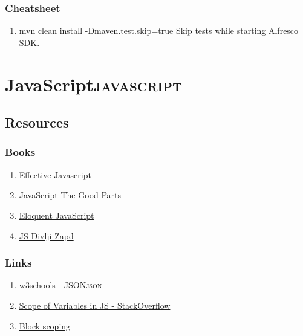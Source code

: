 \documentclass[11pt]{article}
\begin{document}
\subsubsection{Cheatsheet}
\label{sec:org83c35f7}
\begin{enumerate}
\item mvn clean install -Dmaven.test.skip=true
\label{sec:orgd45b603}
Skip tests while starting Alfresco SDK.
\end{enumerate}
\section{JavaScript\hfill{}\textsc{javascript}}
\label{sec:org888be57}
\subsection{Resources}
\label{sec:org2c58d03}
\subsubsection{Books}
\label{sec:orgb77e202}
\begin{enumerate}
\item \href{../notes/pdf/EffectiveJavaScript.pdf::1}{Effective Javascript}
\label{sec:orge2e2073}
\item \href{../notes/pdf/JavaScriptTheGoodParts.pdf::1}{JavaScript The Good Parts}
\label{sec:org441f57a}
\item \href{../notes/pdf/EloquentJavaScript.pdf::1}{Eloquent JavaScript}
\label{sec:org7537d93}
\item \href{../notes/pdf/JSDivljiZapad.pdf::1}{JS Divlji Zapd}
\label{sec:org4f33ecd}
\end{enumerate}
\subsubsection{Links}
\label{sec:org51026a8}
\begin{enumerate}
\item \href{https://www.w3schools.com/js/js\_json\_intro.asp}{w3schools - JSON}\hfill{}\textsc{json}
\label{sec:org644baf1}
\item \href{https://stackoverflow.com/questions/500431/what-is-the-scope-of-variables-in-javascript}{Scope of Variables in JS - StackOverflow}
\label{sec:orgf5908f9}
\item \href{https://developer.mozilla.org/en-US/docs/Web/JavaScript/Reference/Statements/block}{Block scoping}
\label{sec:orgf215a5b}
\end{enumerate}
\end{document}
